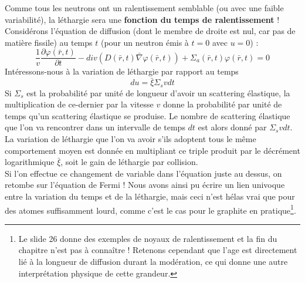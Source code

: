 	Comme tous les neutrons ont un ralentissement semblable (ou avec une faible variabilité), la 
	léthargie sera une \textbf{fonction du temps de ralentissement} !\\
	
	Considérons l'équation de diffusion (dont le membre de droite est nul, car pas de matière 
	fissile) au temps $t$ (pour un neutron émis à $t=0$ avec $u=0$) :
	\begin{equation}
	\frac{1}{v}\frac{{\partial \varphi (\bar r,t)}}{{\partial t}} - div(D(\bar r,t)\bar \nabla \varphi
	(\bar r,t)) + {\Sigma _a}(\bar r,t)\varphi (\bar r,t) = 0
	\end{equation}
	Intéressons-nous à la variation de léthargie par rapport au temps 
	\begin{equation}
	du = \bar \xi {\Sigma _s}vdt
	\end{equation}
	Si $\Sigma_s$ est la probabilité par unité de longueur d'avoir un scattering élastique, la 
	multiplication de ce-dernier par la vitesse $v$	donne la probabilité par unité de temps qu'un 
	scattering élastique se produise. Le nombre de scattering élastique que l'on va rencontrer dans 
	un intervalle de temps $dt$ est alors donné par $\Sigma_svdt$. La variation de léthargie que l'on
	va avoir s'ils adoptent tous le même comportement moyen est donnée en multipliant ce triple 
	produit par le décrément logarithmique $\bar \xi$, soit le gain de léthargie par collision.\\
	
	Si l'on effectue ce changement de variable dans l'équation juste au dessus, on retombe sur 
	l'équation de Fermi ! Nous avons ainsi pu écrire un lien univoque entre la variation du temps 
	et de la léthargie, mais ceci n'est hélas vrai que pour des atomes suffisamment lourd, comme 
	c'est le cas pour le graphite en pratique\footnote{Le slide 26 donne des exemples de noyaux 
	de ralentissement et la fin du chapitre n'est pas à connaître ! Retenons cependant que l'age 
	est directement lié à la longueur de diffusion durant la modération, ce qui donne une autre 
	interprétation physique de cette grandeur.}.